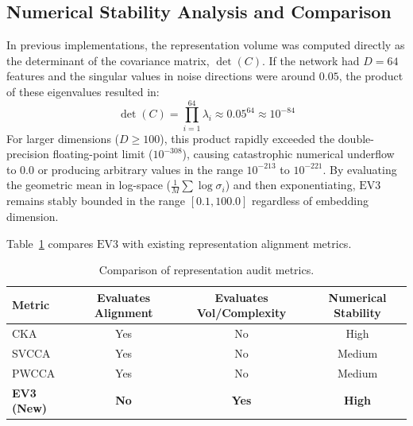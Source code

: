 \subsection{Numerical Stability Analysis and Comparison}
In previous implementations, the representation volume was computed directly as the determinant of the covariance matrix, $\det(C)$. If the network had $D=64$ features and the singular values in noise directions were around $0.05$, the product of these eigenvalues resulted in:
\begin{equation}
\det(C) = \prod_{i=1}^{64} \lambda_i \approx 0.05^{64} \approx 10^{-84}
\end{equation}
For larger dimensions ($D \ge 100$), this product rapidly exceeded the double-precision floating-point limit ($10^{-308}$), causing catastrophic numerical underflow to $0.0$ or producing arbitrary values in the range $10^{-213}$ to $10^{-221}$. By evaluating the geometric mean in log-space ($\frac{1}{M}\sum \log\sigma_i$) and then exponentiating, $\text{EV3}$ remains stably bounded in the range $[0.1, 100.0]$ regardless of embedding dimension.

Table~\ref{tab:comparison} compares $\text{EV3}$ with existing representation alignment metrics.

\begin{table}[h]
\centering
\caption{Comparison of representation audit metrics.}
\label{tab:comparison}
\begin{tabular}{lccc}
\toprule
Metric & Evaluates Alignment & Evaluates Vol/Complexity & Numerical Stability \\
\midrule
CKA & Yes & No & High \\
SVCCA & Yes & No & Medium \\
PWCCA & Yes & No & Medium \\
\textbf{EV3 (New)} & \textbf{No} & \textbf{Yes} & \textbf{High} \\
\bottomrule
\end{tabular}
\end{table}

